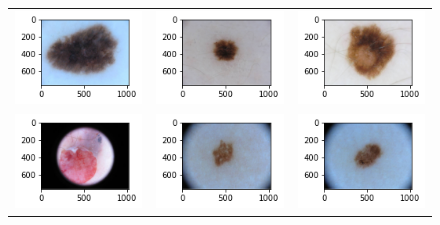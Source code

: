 \begin{figure}[!b]
    \centering
    \begin{tabular}{ccc}
        \includegraphics[width=4cm]{../Plots/THR/sample_0.png} &
        \includegraphics[width=4cm]{../Plots/THR/sample_1.png} &
        \includegraphics[width=4cm]{../Plots/THR/sample_2.png} \\

        \includegraphics[width=4cm]{../Plots/THR/sample_3.png} &
        \includegraphics[width=4cm]{../Plots/THR/sample_4.png} &
        \includegraphics[width=4cm]{../Plots/THR/sample_5.png} \\


\end{tabular}
\end{figure}
